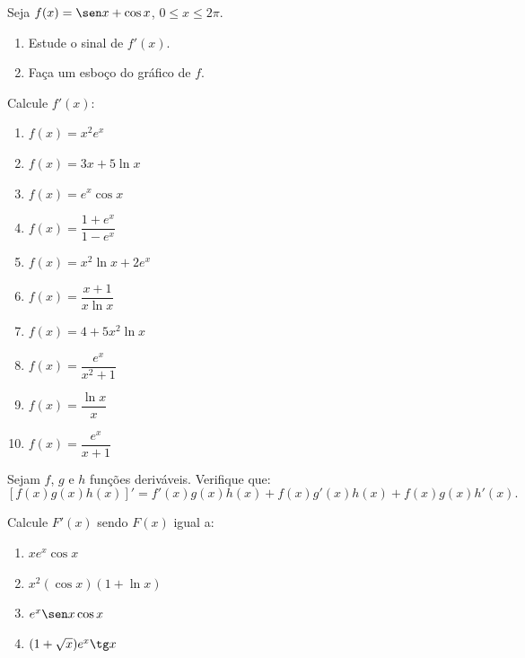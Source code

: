 \begin{exercicio}[11]
\label{ex:7.7.11}
Seja $f(x) = \sen x + \cos x$, $0 \le x \le 2\pi$.
\begin{enumerate}[label=\alph*)]
    \item Estude o sinal de $f'(x)$.
    \item Faça um esboço do gráfico de $f$.
\end{enumerate}
\end{exercicio}

\begin{exercicio}[12]
\label{ex:7.7.12}
Calcule $f'(x)$:
\begin{enumerate}[label=\alph*)]
    \item $f(x) = x^2 e^x$
    \item $f(x) = 3x + 5\ln x$
    \item $f(x) = e^x \cos x$
    \item $f(x) = \dfrac{1 + e^x}{1 - e^x}$
    \item $f(x) = x^2 \ln x + 2e^x$
    \item $f(x) = \dfrac{x + 1}{x\ln x}$
    \item $f(x) = 4 + 5x^2 \ln x$
    \item $f(x) = \dfrac{e^x}{x^2 + 1}$
    \item $f(x) = \dfrac{\ln x}{x}$
    \item $f(x) = \dfrac{e^x}{x + 1}$
\end{enumerate}
\end{exercicio}

\begin{exercicio}[13]
\label{ex:7.7.13}
Sejam $f$, $g$ e $h$ funções deriváveis. Verifique que:
\[
[f(x)g(x)h(x)]' = f'(x)g(x)h(x) + f(x)g'(x)h(x) + f(x)g(x)h'(x).
\]
\end{exercicio}

\begin{exercicio}[14]
\label{ex:7.7.14}
Calcule $F'(x)$ sendo $F(x)$ igual a:
\begin{enumerate}[label=\alph*)]
    \item $x e^x \cos x$
    \item $x^2 (\cos x)(1 + \ln x)$
    \item $e^x \sen x \cos x$
    \item $(1 + \sqrt{x})e^x \tg x$
\end{enumerate}
\end{exercicio}

